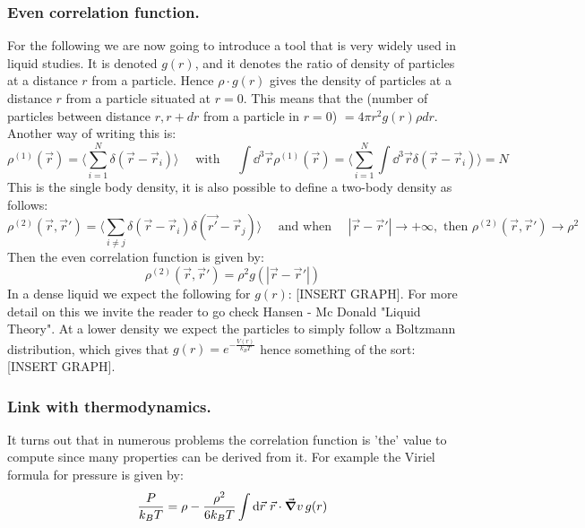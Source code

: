 \documentclass[10pt,a4paper]{book}
\begin{document}
\subsubsection{Even correlation function.}
For the following we are now going to introduce a tool that is very widely used in liquid studies. It is denoted $g(r)$, and it denotes the ratio of density of particles at a distance $r$ from a particle. Hence $\rho \cdot g(r)$ gives the density of particles at a distance $r$ from a particle situated at $r = 0$. This means that the (number of particles between distance $r,r+dr$ from a particle in $r=0$) $=4\pi r^2g(r)\rho dr$. Another way of writing this is:
\[
\rho^{(1)}(\vec{r}) = \langle \sum_{i = 1}^N \delta(\vec{r} - \vec{r}_i ) \rangle \quad \text{ with } \quad \int \dd^3 \vec{r} \rho^{(1)}(\vec{r}) = \langle \sum_{i = 1}^N \int \dd^3 \vec{r} \delta(\vec{r} - \vec{r}_i) \rangle = N
\]
This is the single body density, it is also possible to define a two-body density as follows:
\[
\rho^{(2)}(\vec{r}, \vec{r}') = \langle \sum_{i \neq j} \delta(\vec{r} - \vec{r}_i) \delta (\vec{r'} - \vec{r}_j) \rangle \quad \text{ and when } \quad |\vec{r} - \vec{r}'| \to +\infty, \text{ then } \rho^{(2)}(\vec{r}, \vec{r}') \to \rho^2
\]
Then the even correlation function is given by:
\[
\rho^{(2)}(\vec{r}, \vec{r}') = \rho^2 g(|\vec{r} - \vec{r}'|)
\]
In a dense liquid we expect the following for $g(r)$: [INSERT GRAPH]. For more detail on this we invite the reader to go check Hansen - Mc Donald "Liquid Theory". At a lower density we expect the particles to simply follow a Boltzmann distribution, which gives that $g(r) = e^{-\frac{V(r)}{k_B T}}$  hence something of the sort: [INSERT GRAPH].

\subsubsection{Link with thermodynamics.}
It turns out that in numerous problems the correlation function is 'the' value to compute since many properties can be derived from it. For example the Viriel formula for pressure is given by:
\[
\frac{P}{k_B T} = \rho - \frac{\rho^2}{6 k_B T} \int \dd \vec{r} \,\,\vec{r} \cdot \vec{\grad} v \,g(r)
\]
\end{document}
